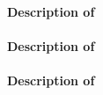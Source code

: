 \paragraph{Description of }

\paragraph{Description of }

\paragraph{Description of }



 
 
 
% 
%
